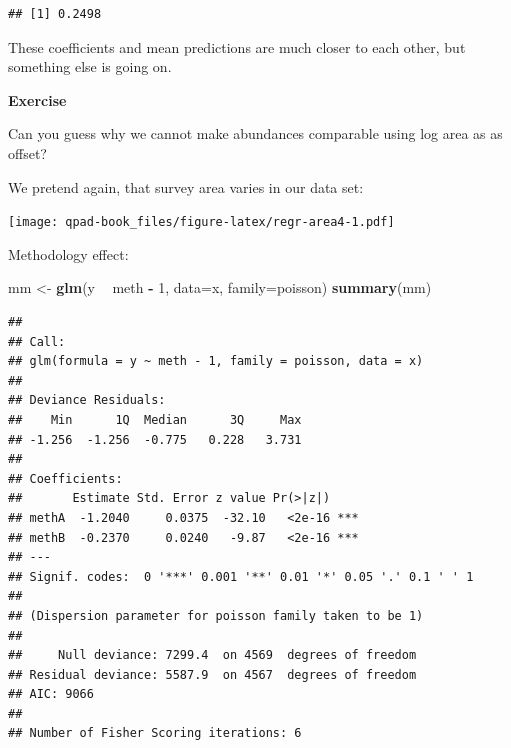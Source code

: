 \documentclass[12pt,]{book}
\newenvironment{Shaded}{\begin{snugshade}}{\end{snugshade}}
\newcommand{\DataTypeTok}[1]{\textcolor[rgb]{0.13,0.29,0.53}{#1}}
\newcommand{\DecValTok}[1]{\textcolor[rgb]{0.00,0.00,0.81}{#1}}
\newcommand{\KeywordTok}[1]{\textcolor[rgb]{0.13,0.29,0.53}{\textbf{#1}}}
\newcommand{\NormalTok}[1]{#1}
\newcommand{\OperatorTok}[1]{\textcolor[rgb]{0.81,0.36,0.00}{\textbf{#1}}}
\newcommand{\OtherTok}[1]{\textcolor[rgb]{0.56,0.35,0.01}{#1}}
\newcommand{\StringTok}[1]{\textcolor[rgb]{0.31,0.60,0.02}{#1}}
\let\BeginKnitrBlock\begin \let\EndKnitrBlock\end
\begin{document}
\begin{verbatim}
## [1] 0.2498
\end{verbatim}

These coefficients and mean predictions are much closer to each other,
but something else is going on.

\BeginKnitrBlock{rmdexercise}
\textbf{Exercise}

Can you guess why we cannot make abundances comparable using
log area as as offset?
\EndKnitrBlock{rmdexercise}

We pretend again, that survey area varies in our data set:

\begin{Shaded}
\end{Shaded}

\texttt{[image: qpad-book\_files/figure-latex/regr-area4-1.pdf]}

Methodology effect:

\begin{Shaded}
\begin{Highlighting}[]
\NormalTok{mm <-}\StringTok{ }\KeywordTok{glm}\NormalTok{(y }\OperatorTok{~}\StringTok{ }\NormalTok{meth }\OperatorTok{-}\StringTok{ }\DecValTok{1}\NormalTok{, }\DataTypeTok{data=}\NormalTok{x, }\DataTypeTok{family=}\NormalTok{poisson)}
\KeywordTok{summary}\NormalTok{(mm)}
\end{Highlighting}
\end{Shaded}

\begin{verbatim}
## 
## Call:
## glm(formula = y ~ meth - 1, family = poisson, data = x)
## 
## Deviance Residuals: 
##    Min      1Q  Median      3Q     Max  
## -1.256  -1.256  -0.775   0.228   3.731  
## 
## Coefficients:
##       Estimate Std. Error z value Pr(>|z|)    
## methA  -1.2040     0.0375  -32.10   <2e-16 ***
## methB  -0.2370     0.0240   -9.87   <2e-16 ***
## ---
## Signif. codes:  0 '***' 0.001 '**' 0.01 '*' 0.05 '.' 0.1 ' ' 1
## 
## (Dispersion parameter for poisson family taken to be 1)
## 
##     Null deviance: 7299.4  on 4569  degrees of freedom
## Residual deviance: 5587.9  on 4567  degrees of freedom
## AIC: 9066
## 
## Number of Fisher Scoring iterations: 6
\end{verbatim}
\end{document}
